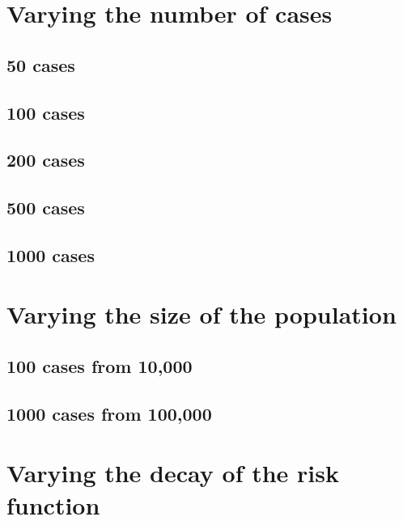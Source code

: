 \section{Varying the number of cases}
\label{sec:results:unif_NCases_1h}

\subsection{50 cases}


\subsection{100 cases}


\subsection{200 cases}


\subsection{500 cases}


\subsection{1000 cases}


\section{Varying the size of the population}
\label{sec:results:unifNpop_100_1h}

\subsection{100 cases from 10,000}


\subsection{1000 cases from 100,000}


\section{Varying the decay of the risk function}


